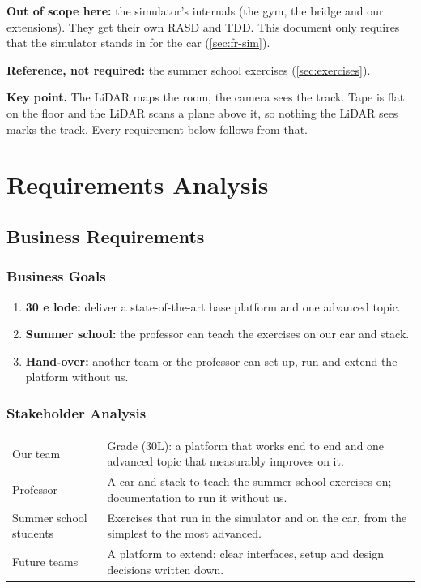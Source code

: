 \documentclass[11pt,a4paper]{article}
\begin{document}
\textbf{Out of scope here:} the simulator's internals (the gym, the bridge and our  extensions). They get their own RASD and TDD. This document only requires that the simulator stands in for the car (\cref{sec:fr-sim}).

\textbf{Reference, not required:} the summer school exercises (\cref{sec:exercises}).

\begin{takeaway}
\textbf{Key point.} The LiDAR maps the room, the camera sees the track. Tape is flat on the floor and the LiDAR scans a plane above it, so nothing the LiDAR sees marks the track. Every requirement below follows from that.
\end{takeaway}

\section{Requirements Analysis}
\subsection{Business Requirements}
\subsubsection{Business Goals}
\begin{enumerate}
  \item \textbf{30 e lode:} deliver a state-of-the-art base platform and one advanced topic.
  \item \textbf{Summer school:} the professor can teach the exercises on our car and stack.
  \item \textbf{Hand-over:} another team or the professor can set up, run and extend the platform without us.
\end{enumerate}

\subsubsection{Stakeholder Analysis}
\begin{tabularx}{\textwidth}{@{}L{3.5cm} Y@{}}
\toprule
{} &  \\
\midrule
Our team & Grade (30L): a platform that works end to end and one advanced topic that measurably improves on it. \\
Professor & A car and stack to teach the summer school exercises on; documentation to run it without us. \\
Summer school students & Exercises that run in the simulator and on the car, from the simplest to the most advanced. \\
Future teams & A platform to extend: clear interfaces, setup and design decisions written down. \\
\bottomrule
\end{tabularx}
\end{document}
